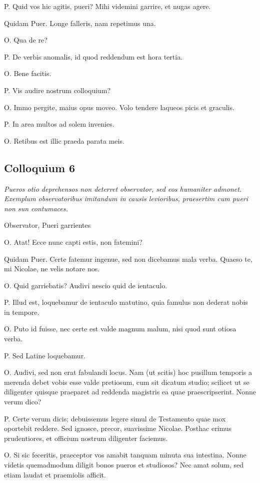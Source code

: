 \documentclass{article}
\begin{document}
P. Quid vos hic agitis, pueri? Mihi videmini garrire, et nugas agere. 

Quidam Puer. Longe falleris, nam repetimus una. 

O. Qua de re?

P. De verbis anomalis, id quod reddendum est hora tertia. 

O. Bene facitis. 

P. Vis audire nostrum colloquium?

O. Immo pergite, maius opus moveo. Volo tendere laqueos picis et graculis. 

P. In area multos ad solem invenies. 

O. Retibus est illic praeda parata meis.

\subsection{Colloquium 6}
\emph{Pueros otio deprehensos non deterret observator, sed eos humaniter admonet. Exemplum observatoribus imitandum in causis levioribus, praesertim cum pueri non sun contumaces.}

Observator, Pueri garrientes

O. Atat! Ecce nunc capti estis, non fatemini?

Quidam Puer. Certe fatemur ingenue, sed non dicebamus mala verba. Quaeso te, mi Nicolae, ne velis notare nos.
 
O. Quid garriebatis? Audivi nescio quid de ientaculo.

P. Illud est, loquebamur de ientaculo matutino, quia famulus non dederat nobis in tempore.
 
O. Puto id fuisse, nec certe est valde magnum malum, nisi quod sunt otiosa verba. 

P. Sed Latine loquebamur. 

O. Audivi, sed non erat fabulandi locus. Nam (ut scitis) hoc pusillum temporis a merenda debet vobis esse valde pretiosum, cum sit dicatum studio; scilicet ut se diligenter quisque praeparet ad reddenda magistris ea quae praescripserint. Nonne verum dico?

P. Certe verum dicis; debuissemus legere simul de Testamento quae mox oportebit reddere. Sed ignosce, precor, suavissime Nicolae. Posthac erimus prudentiores, et officium nostrum diligenter faciemus.
 
O. Si sic feceritis, praeceptor vos amabit tanquam minuta sua intestina. Nonne videtis quemadmodum diligit bonos pueros et studiosos? Nec amat solum, sed etiam laudat et praemiolis afficit. 
\end{document}
